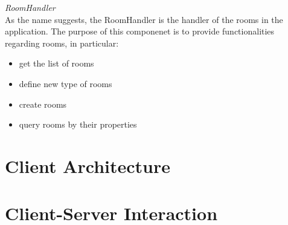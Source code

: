 \bigskip
\textit{RoomHandler}
\\
As the name suggests, the RoomHandler is the handler of the rooms in the application. The purpose of this componenet is to provide functionalities regarding rooms, in particular:
\begin{itemize}
	\item get the list of rooms
	\item define new type of rooms
	\item create rooms
	\item query rooms by their properties
\end{itemize}




\section{Client Architecture}

\section{Client-Server Interaction}